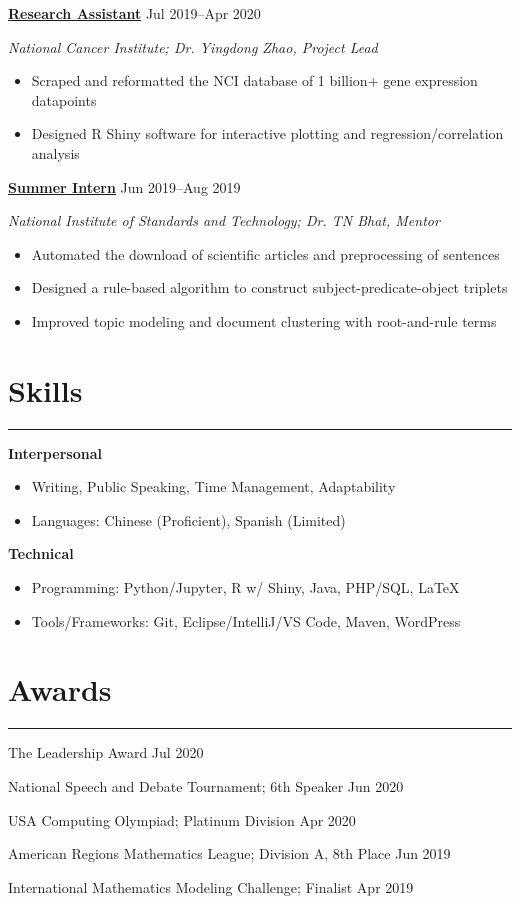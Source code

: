 \documentclass[11pt]{article}
\newcommand{\resumesection}[1]{\vspace{-0.3cm}\section*{\color{highlight}#1}\vspace{-0.3cm}\hrule\vspace{0.3cm}}
\begin{document}
\textbf{\href{https://github.com/petezh/TP-Workbench}{Research Assistant}} \hfill Jul 2019--Apr 2020 \par
\textit{National Cancer Institute; Dr. Yingdong Zhao, Project Lead}
\begin{itemize}
	\item Scraped and reformatted the NCI database of 1 billion+ gene expression datapoints
	\item Designed R Shiny software for interactive plotting and regression/correlation analysis
\end{itemize}\vspace{0.1cm}

\textbf{\href{https://github.com/petezh/Root-and-Rule-NLP}{Summer Intern}} \hfill Jun 2019--Aug 2019\par
\textit{National Institute of Standards and Technology; Dr. TN Bhat, Mentor}
\begin{itemize}
	\item Automated the download of scientific articles and preprocessing of sentences
	\item Designed a rule-based algorithm to construct subject-predicate-object triplets
	\item Improved topic modeling and document clustering with root-and-rule terms
\end{itemize}\vspace{0.1cm}

\resumesection{Skills}

\textbf{Interpersonal}
\begin{itemize} 
	\item Writing, Public Speaking, Time Management, Adaptability
	\item Languages: Chinese (Proficient), Spanish (Limited)
\end{itemize}\vspace{0.1cm}

\textbf{Technical}
\begin{itemize} 
	\item Programming: Python/Jupyter, R w/ Shiny, Java, PHP/SQL, \LaTeX
	\item Tools/Frameworks: Git, Eclipse/IntelliJ/VS Code, Maven, WordPress
\end{itemize}\vspace{0.1cm}

\resumesection{Awards}

The Leadership Award \hfill Jul 2020 \par
National Speech and Debate Tournament; 6th Speaker \hfill Jun 2020 \par
USA Computing Olympiad; Platinum Division \hfill Apr 2020 \par
American Regions Mathematics League; Division A, 8th Place \hfill Jun 2019 \par
International Mathematics Modeling Challenge; Finalist \hfill Apr 2019\par
\end{document}
